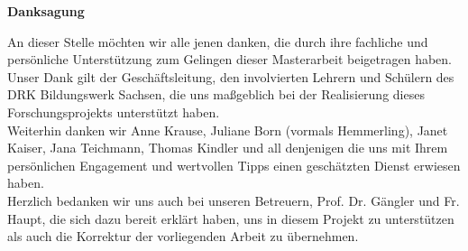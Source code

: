 \vspace*{\fill}
\begin{center}
\textbf{Danksagung}
\end{center}

\noindent 
An dieser Stelle möchten wir alle jenen danken, die durch ihre fachliche und persönliche Unterstützung zum Gelingen dieser Masterarbeit beigetragen haben.\\[0,5cm]
Unser Dank gilt der Geschäftsleitung, den involvierten Lehrern und Schülern des DRK Bildungswerk Sachsen, die uns maßgeblich bei der Realisierung dieses Forschungsprojekts unterstützt haben.\\[0,5cm]
Weiterhin danken wir Anne Krause, Juliane Born (vormals Hemmerling), Janet Kaiser, Jana Teichmann, Thomas Kindler und all denjenigen die uns mit Ihrem persönlichen Engagement und wertvollen Tipps einen geschätzten Dienst erwiesen haben.\\[0,5cm]
Herzlich bedanken wir uns auch bei unseren Betreuern, Prof. Dr. Gängler und Fr. Haupt, die sich dazu bereit erklärt haben, uns in diesem Projekt zu unterstützen als auch die Korrektur der vorliegenden Arbeit zu übernehmen.
\vspace{\fill}